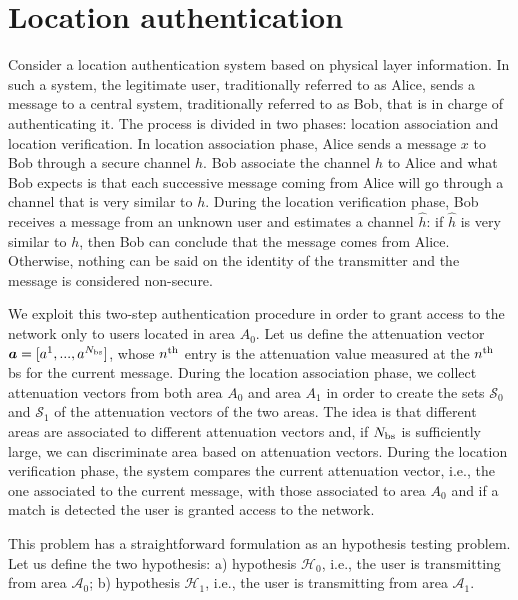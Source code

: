 \documentclass[draftcls,onecolumn,12pt]{IEEEtran}
\begin{document}
\section{Location authentication}\label{sec:auth}
Consider a location authentication system based on physical layer information. In such a system, the legitimate user, traditionally referred to as Alice, sends a message to a central system, traditionally referred to as Bob, that is in charge of authenticating it. The process is divided in two phases: location association and location verification. In location association phase, Alice sends a message $x$ to Bob through a secure channel $h$. Bob associate the channel $h$ to Alice and what Bob expects is that each successive message coming from Alice will go through a channel that is very similar to $h$. During the location verification phase, Bob receives a message from an unknown user and estimates a channel $\hat{h}$: if $\hat{h}$ is very similar to $h$, then Bob can conclude that the message comes from Alice. Otherwise, nothing can be said on the identity of the transmitter and the message is considered non-secure.

We exploit this two-step authentication procedure in order to grant access to the network only to users located in area $A_0$. Let us define the attenuation vector $\bm{a}=[a^1,...,a^{N_{\rm bs}}]$, whose $n^{\rm th}$ entry is the attenuation value measured at the $n^{\rm th}$ \ac{bs} for the current message. During the location association phase, we collect attenuation vectors from both area $A_0$ and area $A_1$ in order to create the sets $\mathcal{S}_0$ and $\mathcal{S}_1$ of the attenuation vectors of the two areas. The idea is that different areas are associated to different attenuation vectors and, if $N_{\rm bs}$ is sufficiently large, we can discriminate area based on attenuation vectors. During the location verification phase, the system compares the current attenuation vector, i.e., the one associated to the current message, with those associated to area $A_0$ and if a match is detected the user is granted access to the network.

This problem has a straightforward formulation as an hypothesis testing problem. Let us define the two hypothesis: a) hypothesis $\mathcal{H}_0$, i.e., the user is transmitting from area $\mathcal{A}_0$; b) hypothesis $\mathcal{H}_1$, i.e., the user is transmitting from area $\mathcal{A}_1$.
\end{document}
